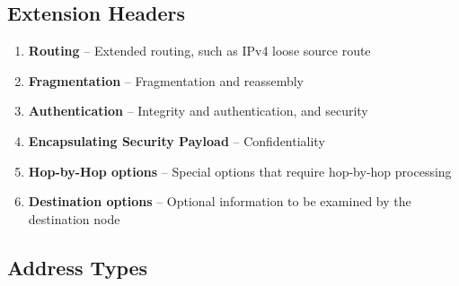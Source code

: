 \subsection[EH]{Extension Headers}\cite{IPv6Pack77:online}

\begin{enumerate}
    \item \textbf{Routing} -- Extended routing, such as IPv4 loose source route
    \item \textbf{Fragmentation} -- Fragmentation and reassembly
    \item \textbf{Authentication} -- Integrity and authentication, and security
    \item \textbf{Encapsulating Security Payload} -- Confidentiality
    \item \textbf{Hop-by-Hop options} -- Special options that require hop-by-hop processing
    \item \textbf{Destination options} -- Optional information to be examined by the destination node
\end{enumerate}

\subsection{Address Types}

